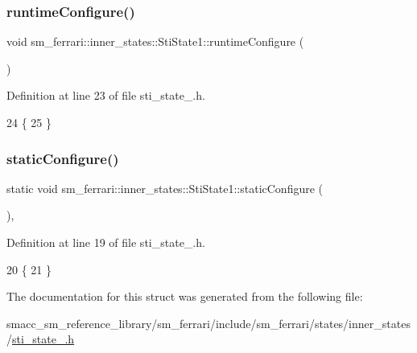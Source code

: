 \subsubsection{\texorpdfstring{runtime\+Configure()}{runtimeConfigure()}}
{\footnotesize\ttfamily void sm\+\_\+ferrari\+::inner\+\_\+states\+::\+Sti\+State1\+::runtime\+Configure (\begin{DoxyParamCaption}{ }\end{DoxyParamCaption})\hspace{0.3cm}{\ttfamily [inline]}}



Definition at line 23 of file sti\+\_\+state\+\_.\+h.


\begin{DoxyCode}
24   \{
25   \}
\end{DoxyCode}
\mbox{\label{structsm__ferrari_1_1inner__states_1_1StiState1_afc56be47f929630c2d02070b83790829}} 
\subsubsection{\texorpdfstring{static\+Configure()}{staticConfigure()}}
{\footnotesize\ttfamily static void sm\+\_\+ferrari\+::inner\+\_\+states\+::\+Sti\+State1\+::static\+Configure (\begin{DoxyParamCaption}{ }\end{DoxyParamCaption})\hspace{0.3cm}{\ttfamily [inline]}, {\ttfamily [static]}}



Definition at line 19 of file sti\+\_\+state\+\_.\+h.


\begin{DoxyCode}
20   \{
21   \}
\end{DoxyCode}


The documentation for this struct was generated from the following file\+:\begin{DoxyCompactItemize}
\item 
smacc\+\_\+sm\+\_\+reference\+\_\+library/sm\+\_\+ferrari/include/sm\+\_\+ferrari/states/inner\+\_\+states/\hyperlink{sm__ferrari_2include_2sm__ferrari_2states_2inner__states_2sti__state__1_8h}{sti\+\_\+state\+\_.\+h}\end{DoxyCompactItemize}
